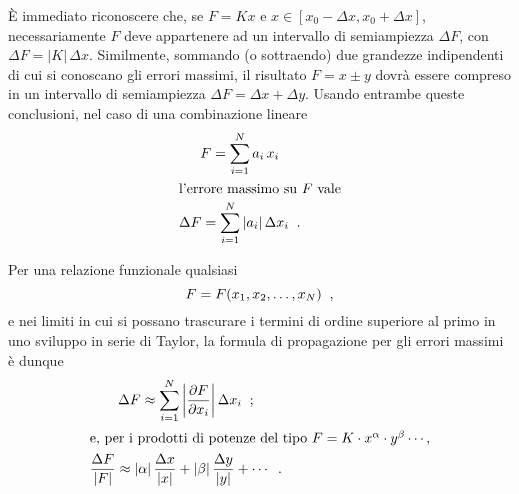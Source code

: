 \`E immediato riconoscere che, se $F = Kx$ e $x \in [ x_0 -
\Delta x, x_0 + \Delta x ]$, necessariamente $F$ deve
appartenere ad un intervallo di semiampiezza $\Delta F$, con
$\Delta F = |K| \, \Delta x$.  Similmente, sommando (o
sottraendo) due grandezze indipendenti di cui si conoscano
gli errori massimi, il risultato $F = x \pm y$ dovr\`a
essere compreso in un intervallo di semiampiezza $\Delta F =
\Delta x + \Delta y$.  Usando entrambe queste conclusioni,
nel caso di una combinazione lineare%
\begin{gather*}
  F = \sum_{i=1}^N a_i \, x_i \\
  \intertext{l'errore massimo su $F$ vale}
  \Delta F = \sum_{i=1}^N \left| a_i \right| \Delta x_i \;\;
  .
\end{gather*}

Per una relazione funzionale qualsiasi
\begin{equation*}
  F = F(x_1, x_2, \ldots, x_N) \peq ,
\end{equation*}
e nei limiti in cui si possano trascurare i termini di
ordine superiore al primo in uno sviluppo in serie di
Taylor, la formula di propagazione per gli errori massimi
\`e dunque
\begin{gather*}
  \Delta F \approx \sum_{i=1}^N \left| \frac{\partial
    F}{\partial x_i} \right| \Delta x_i \;\; ; \\
  \intertext{e, per i prodotti di potenze del tipo $ F = K
    \cdot x^\alpha \cdot y^\beta \cdots$,}
  \frac{\Delta F}{|F|} \approx |\alpha| \, \frac{\Delta
    x}{|x|} + |\beta| \, \frac{\Delta y}{|y|}  + \cdots \;\;
  .
\end{gather*}%
%

\endinput
